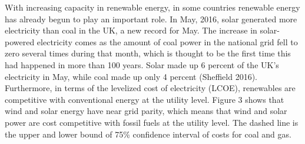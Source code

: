 With increasing capacity in renewable energy, in some countries
renewable energy has already begun to play an important role. In May,
2016, solar generated more electricity than coal in the UK, a new record
for May. The increase in solar-powered electricity comes as the amount
of coal power in the national grid fell to zero several times during
that month, which is thought to be the first time this had happened in
more than 100 years. Solar made up 6 percent of the UK's electricity in
May, while coal made up only 4 percent (Sheffield 2016). Furthermore, in
terms of the levelized cost of electricity (LCOE), renewables are
competitive with conventional energy at the utility level. Figure 3
shows that wind and solar energy have near grid parity, which means that
wind and solar power are cost competitive with fossil fuels at the
utility level. The dashed line is the upper and lower bound of 75\%
confidence interval of costs for coal and gas.



%